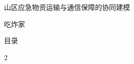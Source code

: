 \documentclass[UTF8,zihao=-4,a4paper,fontset=windows]{ctexart}
\begin{document}
\begin{center}
{\heiti{}山区应急物资运输与通信保障的协同建模}\par\medskip
吃炸家
\end{center}

\clearpage
\begin{center}{\heiti{}目\quad 录}\end{center}
\vspace{-0.8em}
\begingroup
\scriptsize
\renewcommand{\baselinestretch}{0.90}\selectfont
\setlength{\parskip}{0pt}
\begin{multicols}{2}
\raggedcolumns
\makeatletter{}\makeatother
\end{multicols}
\endgroup
\clearpage










\begingroup
\footnotesize


\endgroup
\clearpage
\appendix



\end{document}
